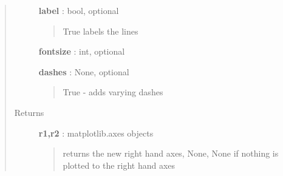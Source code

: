 \documentclass[letterpaper,10pt,english]{sphinxmanual}
\begin{document}
\begin{fulllineitems}
\begin{quote}
\begin{description}
\textbf{label} : bool, optional
\begin{quote}

True labels the lines
\end{quote}

\textbf{fontsize} : int, optional

\textbf{dashes} : None, optional
\begin{quote}

True - adds varying dashes
\end{quote}

\item[{Returns}] \leavevmode
\textbf{r1,r2} : matplotlib.axes objects
\begin{quote}

returns the new right hand axes, None, None if nothing is plotted to the right hand axes
\end{quote}

\end{description}\end{quote}

\end{fulllineitems}

\end{document}
